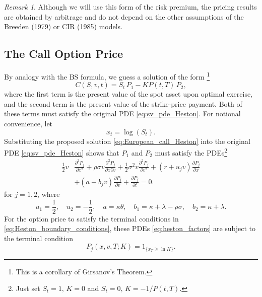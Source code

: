 \documentclass[a4paper,12pt]{article}
\numberwithin{equation}{section}
\theoremstyle{definition}
\theoremstyle{remark}
\newtheorem{remark}{Remark}[section]
\begin{document}
\begin{remark}
Although we will use this form of the risk premium, the pricing 
results are obtained by arbitrage and do not depend on the other 
assumptions of the Breeden (1979) or CIR (1985) models.
\end{remark}

\subsection{The Call Option Price}
By analogy with the BS formula, we guess a solution of the form
\footnote{This is a corollary of Girsanov's Theorem.}
\begin{equation}
\label{eq:European_call_Heston}
    C(S,v,t)=S_{t}\,P_{1}-KP(t,T)\,P_{2},
\end{equation}
where the first term is the present value of the spot asset upon 
optimal exercise, and the second term is the present value of the 
strike-price payment. Both of these terms must satisfy the 
original PDE \eqref{eq:sv_pde_Heston}. For notional convenience, 
let
\begin{equation}
\label{eq:stock_log_Heston}
    x_{t}=\log(S_{t}).
\end{equation}
Substituting the proposed solution \eqref{eq:European_call_Heston} 
into the original PDE \eqref{eq:sv_pde_Heston} shows that $P_1$ and 
$P_2$ must satisfy the PDEs\footnote{Just set $S_{t}=1,\,K=0$ and 
$S_{t}=0,\,K=-1/P(t,T)$.}
\begin{equation}\label{eq:heston_factors}
    \begin{split}
        \frac{1}{2}v & \frac{\partial^{2} P_{j}}{\partial {x}^{2}}
        +\rho\sigma v\frac{\partial^{2} P_{j}}{\partial {x} \partial {v}}
        +\frac{1}{2}\sigma^{2}v\frac{\partial^{2} P_{j}}{\partial {v}^{2}}
        +(r+u_{j}v)\frac{\partial P_{j}}{\partial x} \\
        & +(a-b_{j}v)\frac{\partial P_{j}}{\partial v}
        +\frac{\partial P_{j}}{\partial t}=0.
    \end{split}    
\end{equation}
for $j=1,2$, where 
\begin{equation}
    u_{1}=\frac{1}{2},\quad u_{2}=-\frac{1}{2},\quad 
    a=\kappa\theta,\quad b_{1}=\kappa+\lambda-\rho\sigma,\quad 
    b_{2}=\kappa+\lambda.
\end{equation}
For the option price to satisfy the terminal conditions in 
\eqref{eq:Heston_boundary_conditions}, these PDEs 
\eqref{eq:heston_factors} are subject to the terminal condition
\begin{equation}\label{eq:heston_discounters}
    P_{j}(x,v,T;K)=1_{\{x_{T}\geq\ln{K}\}}.
\end{equation}
\end{document}
